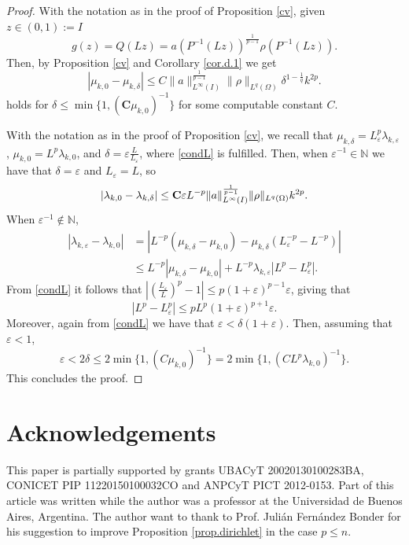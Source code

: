\documentclass[12pt]{amsart}
\theoremstyle{definition}
\theoremstyle{remark}
\numberwithin{equation}{section}
\begin{document}
\begin{proof}
With the notation as in the proof of Proposition \ref{cv}, given $z\in(0,1):=I$
$$
g(z)= Q(Lz)= a(P^{-1}(Lz))^\frac{1}{p-1} \rho(P^{-1}(Lz)).
$$
Then, by Proposition \ref{cv} and Corollary \ref{cor.d.1} we get
$$
|\mu_{k,0}-\mu_{k,\delta}| \leq C \|a\|_{L^\infty(I)}^\frac{1}{p-1}\|\rho\|_{L^q(\Omega)}\delta^{1-\frac{1}{q}}  k^{2p}.
$$
holds for $\delta \leq \min\{1,(\textbf{C} \mu_{k,0})^{-1}\}$ for some computable constant $C$.


With the notation as in the proof of Proposition \ref{cv}, we recall that $\mu_{k,\delta}=L^p_\varepsilon \lambda_{k,\varepsilon}$, $\mu_{k,0}= L^p \lambda_{k,0}$, and $\delta=\varepsilon\frac{L}{L_\varepsilon}$, where  \eqref{condL} is fulfilled.
Then, when $\varepsilon^{-1}\in \mathbb N$ we have that $\delta=\varepsilon$ and $L_\varepsilon=L$, so
$$
|\lambda_{k,0}-\lambda_{k,\delta}| \leq {\bf C} \varepsilon  L^{-p} \|a\|_{L^\infty(I)}^\frac{1}{p-1} \|\rho\|_{L^q(\Omega)}    k^{2p}.
$$
When $\varepsilon^{-1}\not\in \mathbb N$, 
\begin{align*}
|\lambda_{k,\varepsilon}-\lambda_{k,0}|&= |L^{-p}(\mu_{k,\delta} - \mu_{k,0})-\mu_{k,\delta}(L_\varepsilon^{-p}-L^{-p})|\\
&\leq L^{-p} |\mu_{k,\delta}-\mu_{k,0}| + L^{-p} \lambda_{k,\varepsilon} |L^p-L_\varepsilon^p|.
\end{align*}
From \eqref{condL} it follows that $\left|\left(\frac{L_\varepsilon}{L}\right)^p -1\right| \leq p (1+\varepsilon)^{p-1}\varepsilon$, giving that
$$
|L^p-L_\varepsilon^p|\leq pL^p (1+\varepsilon)^{p+1}\varepsilon.
$$
Moreover, again from \eqref{condL} we have that $\varepsilon < \delta (1+\varepsilon)$. Then, assuming that $\varepsilon<1$,
$$
\varepsilon< 2\delta \leq 2\min\{1,(C \mu_{k,0})^{-1}\} = 2\min\{1,(C L^p \lambda_{k,0})^{-1}\}.
$$
This concludes the proof.
\end{proof}







\section*{Acknowledgements}
This paper is partially supported by grants UBACyT 20020130100283BA, CONICET PIP 11220150100032CO and ANPCyT PICT 2012-0153. Part of this article was written while the author was a professor at the Universidad de Buenos Aires, Argentina. The author want to thank to Prof. Juli\'an Fern\'andez Bonder for his suggestion to improve Proposition \ref{prop.dirichlet} in the case $p\leq n$.
\end{document}
